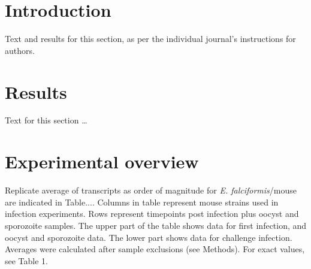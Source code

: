 \documentclass{bmcart}
\begin{document}



\section*{Introduction}
Text and results for this section, as per the individual journal's instructions for authors. 


  \section*{Results}
Text for this section \ldots

\section{Experimental overview}
Replicate average of transcripts as order of magnitude for \textit{E. falciformis}/mouse are indicated in Table.... Columns in table represent mouse strains used in infection experiments. Rows represent timepoints post infection plus oocyst and sporozoite samples. The upper part of the table shows data for first infection, and oocyst and sporozoite data. The lower part shows data for challenge infection. Averages were calculated after sample exclusions (see Methods). For exact values, see Table 1.
\end{document}
